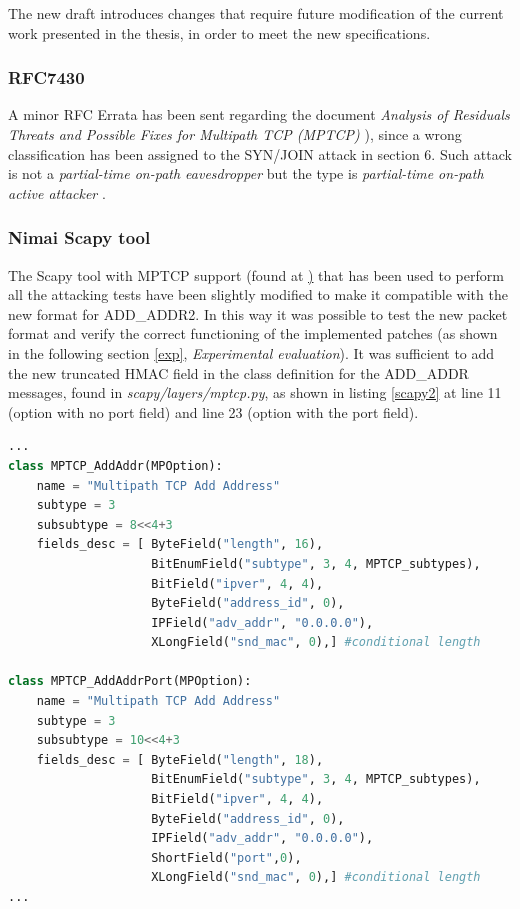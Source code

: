 The new draft introduces changes that require future modification of the current work presented in the thesis, in order to meet the new specifications.

\subsubsection{RFC7430}
A minor RFC Errata has been sent regarding the document \textit{Analysis of Residuals Threats and Possible Fixes for Multipath TCP (MPTCP)} \cite{rfc7430}), since a wrong classification has been assigned to the SYN/JOIN attack in section 6. Such attack is not a \textit{partial-time on-path eavesdropper} but the type is \textit{partial-time on-path active attacker} \cite{errata}.

\subsubsection{Nimai Scapy tool}
The Scapy tool with MPTCP support (found at \href{https://github.com/nimai/mptcp-scapy}) that has been used to perform all the attacking tests have been slightly modified to make it compatible with the new format for ADD\_ADDR2. In this way it was possible to test the new packet format and verify the correct functioning of the implemented patches (as shown in the following section \ref{exp}, \textit{Experimental evaluation}). It was sufficient to add the new truncated HMAC field in the class definition for the ADD\_ADDR messages, found in \textit{scapy/layers/mptcp.py}, as shown in listing \ref{scapy2} at line 11 (option with no port field) and line 23 (option with the port field).

\begin{lstlisting}[language=Python, caption=Scapy ADD\_ADDR2 class definition, label=scapy2]
...
class MPTCP_AddAddr(MPOption):
    name = "Multipath TCP Add Address"
    subtype = 3
    subsubtype = 8<<4+3
    fields_desc = [ ByteField("length", 16),
                    BitEnumField("subtype", 3, 4, MPTCP_subtypes),
                    BitField("ipver", 4, 4),
                    ByteField("address_id", 0),
                    IPField("adv_addr", "0.0.0.0"),
                    XLongField("snd_mac", 0),] #conditional length

class MPTCP_AddAddrPort(MPOption):
    name = "Multipath TCP Add Address"
    subtype = 3
    subsubtype = 10<<4+3
    fields_desc = [ ByteField("length", 18),
                    BitEnumField("subtype", 3, 4, MPTCP_subtypes),
                    BitField("ipver", 4, 4),
                    ByteField("address_id", 0),
                    IPField("adv_addr", "0.0.0.0"),
                    ShortField("port",0),
                    XLongField("snd_mac", 0),] #conditional length
...
\end{lstlisting}

